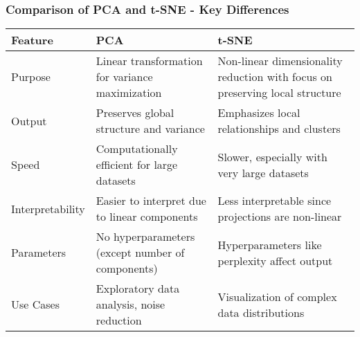 \documentclass{beamer}
\begin{document}
\begin{frame}[fragile]
    \frametitle{Comparison of PCA and t-SNE - Key Differences}

    \begin{table}[ht]
        \centering
        \begin{tabular}{|l|l|l|}
            \hline
            \textbf{Feature} & \textbf{PCA} & \textbf{t-SNE} \\
            \hline
            Purpose & Linear transformation for variance maximization & Non-linear dimensionality reduction with focus on preserving local structure \\
            \hline
            Output & Preserves global structure and variance & Emphasizes local relationships and clusters \\ 
            \hline
            Speed & Computationally efficient for large datasets & Slower, especially with very large datasets \\
            \hline
            Interpretability & Easier to interpret due to linear components & Less interpretable since projections are non-linear \\
            \hline
            Parameters & No hyperparameters (except number of components) & Hyperparameters like perplexity affect output \\
            \hline
            Use Cases & Exploratory data analysis, noise reduction & Visualization of complex data distributions \\
            \hline
        \end{tabular}
    \end{table}
\end{frame}
\end{document}
